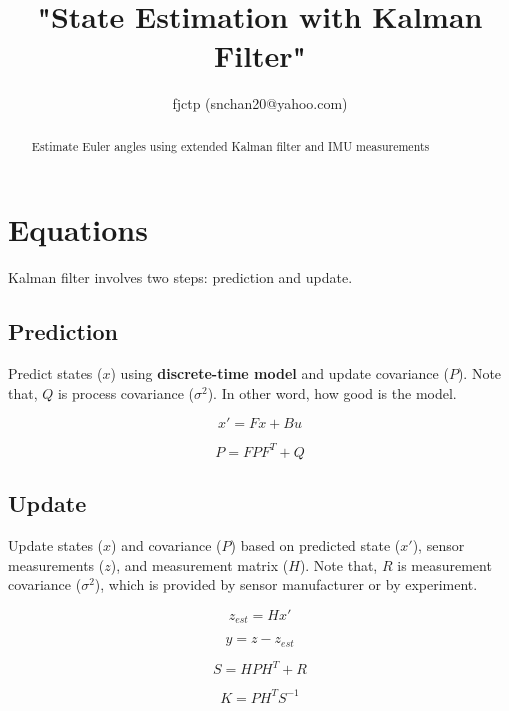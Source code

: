 \documentclass[]{article}
\title{"State Estimation with Kalman Filter"}
\author{fjctp (snchan20@yahoo.com)}
\begin{document}
\maketitle

\begin{abstract}
Estimate Euler angles using extended Kalman filter and IMU measurements
\end{abstract}

\section{Equations}
Kalman filter involves two steps: prediction and update.

\subsection{Prediction}
Predict states ($x$) using \textbf{discrete-time model} and update covariance ($P$). Note that, $Q$ is process covariance ($\sigma^2$). In other word, how good is the model. 

\begin{equation}
x' = Fx + Bu\label{eqn:model}
\end{equation}


\begin{equation}
P = FPF^T + Q\label{eqn:predict_covarance}
\end{equation}

\subsection{Update}
Update states ($x$) and covariance ($P$) based on predicted state ($x'$), sensor measurements ($z$), and measurement matrix ($H$). Note that, $R$ is measurement covariance ($\sigma^2$), which is provided by sensor manufacturer or by experiment.

\begin{equation}
z_{est} = Hx'\label{eqn:predict_measurement}
\end{equation}

\begin{equation}
y = z - z_{est}\label{eqn:measurement_difference}
\end{equation}

\begin{equation}
S = HPH^T + R\label{eqn:innovation_covariance}
\end{equation}

\begin{equation}
K = PH^TS^{-1}\label{eqn:kalman_gain}
\end{equation}
\end{document}

